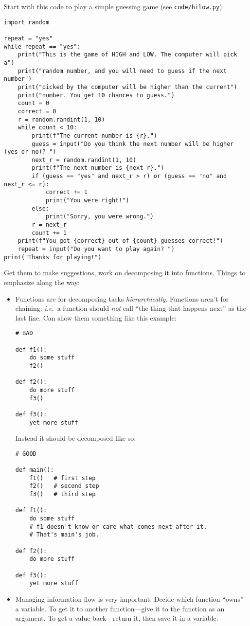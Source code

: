 \documentclass{article}
\begin{document}
Start with this code to play a simple guessing game (see
\verb|code/hilow.py|):

\begin{verbatim}
import random

repeat = "yes"
while repeat == "yes":
    print("This is the game of HIGH and LOW. The computer will pick a")
    print("random number, and you will need to guess if the next number")
    print("picked by the computer will be higher than the current")
    print("number. You get 10 chances to guess.")
    count = 0
    correct = 0
    r = random.randint(1, 10)
    while count < 10:
        print(f"The current number is {r}.")
        guess = input("Do you think the next number will be higher (yes or no)? ")
        next_r = random.randint(1, 10)
        print(f"The next number is {next_r}.")
        if (guess == "yes" and next_r > r) or (guess == "no" and next_r <= r):
            correct += 1
            print("You were right!")
        else:
            print("Sorry, you were wrong.")
        r = next_r
        count += 1
    print(f"You got {correct} out of {count} guesses correct!")
    repeat = input("Do you want to play again? ")
print("Thanks for playing!")
\end{verbatim}

Get them to make suggestions, work on decomposing it into functions.
Things to emphasize along the way:

\begin{itemize}
\item Functions are for decomposing tasks \emph{hierarchically}.
  Functions aren't for chaining: \emph{i.e.}\ a function should \emph{not}
  call ``the thing that happens next'' as the last line. Can show them
  something like this example:
\begin{verbatim}
# BAD

def f1():
    do some stuff
    f2()

def f2():
    do more stuff
    f3()

def f3():
    yet more stuff
\end{verbatim}
  Instead it should be decomposed like so:
\begin{verbatim}
# GOOD

def main():
    f1()   # first step
    f2()   # second step
    f3()   # third step

def f1():
    do some stuff
    # f1 doesn't know or care what comes next after it.
    # That's main's job.

def f2():
    do more stuff

def f3():
    yet more stuff
\end{verbatim}
\item Managing information flow is very important.  Decide which
  function ``owns'' a variable.  To get it to another function---give
  it to the function as an argument.  To get a value back---return it,
  then save it in a variable.
\end{itemize}
\end{document}
